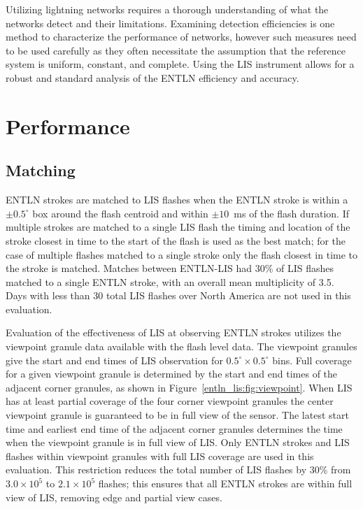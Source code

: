 Utilizing lightning networks requires a thorough understanding of what the networks detect and their limitations.
Examining detection efficiencies is one method to characterize the performance of networks, however such measures need to be used carefully as they often necessitate the assumption that the reference system is uniform, constant, and complete.
Using the LIS instrument allows for a robust and standard analysis of the ENTLN efficiency and accuracy.

\section{Performance}

\subsection{Matching}

ENTLN strokes are matched to LIS flashes when the ENTLN stroke is within a $\pm0.5^\circ$ box around the flash centroid and within $\pm10$~ms of the flash duration.
If multiple strokes are matched to a single LIS flash the timing and location of the stroke closest in time to the start of the flash is used as the best match; for the case of multiple flashes matched to a single stroke only the flash closest in time to the stroke is matched.
Matches between ENTLN-LIS had 30\% of LIS flashes matched to a single ENTLN stroke, with an overall mean multiplicity of 3.5.
Days with less than 30 total LIS flashes over North America are not used in this evaluation.

Evaluation of the effectiveness of LIS at observing ENTLN strokes utilizes the viewpoint granule data available with the flash level data.
The viewpoint granules give the start and end times of LIS observation for $0.5^\circ \times 0.5^\circ$ bins.
Full coverage for a given viewpoint granule is determined by the start and end times of the adjacent corner granules, as shown in Figure~\ref{entln_lis:fig:viewpoint}.
When LIS has at least partial coverage of the four corner viewpoint granules the center viewpoint granule is guaranteed to be in full view of the sensor.
The latest start time and earliest end time of the adjacent corner granules determines the time when the viewpoint granule is in full view of LIS.
Only ENTLN strokes and LIS flashes within viewpoint granules with full LIS coverage are used in this evaluation.
This restriction reduces the total number of LIS flashes by 30\% from $3.0 \times 10^5$ to $2.1 \times 10^5$ flashes; this ensures that all ENTLN strokes are within full view of LIS, removing edge and partial view cases.


